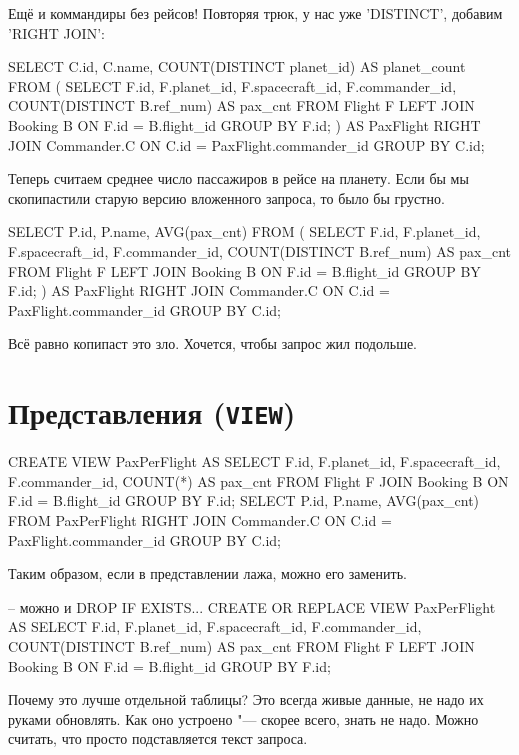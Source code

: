 Ещё и коммандиры без рейсов! Повторяя трюк, у нас уже \sql'DISTINCT', добавим \sql'RIGHT JOIN':
\begin{sqlcode}
SELECT
	C.id, C.name, COUNT(DISTINCT planet_id) AS planet_count
	FROM (
		SELECT
			F.id, F.planet_id, F.spacecraft_id, F.commander_id, COUNT(DISTINCT B.ref_num) AS pax_cnt
			FROM Flight F LEFT JOIN Booking B ON F.id = B.flight_id
			GROUP BY F.id;
	) AS PaxFlight
	RIGHT JOIN Commander.C ON C.id = PaxFlight.commander_id
	GROUP BY C.id;
\end{sqlcode}
Теперь считаем среднее число пассажиров в рейсе на планету.
Если бы мы скопипастили старую версию вложенного запроса, то было бы грустно.
\begin{sqlcode}
SELECT
	P.id, P.name, AVG(pax_cnt)
	FROM (
		SELECT
			F.id, F.planet_id, F.spacecraft_id, F.commander_id, COUNT(DISTINCT B.ref_num) AS pax_cnt
			FROM Flight F LEFT JOIN Booking B ON F.id = B.flight_id
			GROUP BY F.id;
	) AS PaxFlight
	RIGHT JOIN Commander.C ON C.id = PaxFlight.commander_id
	GROUP BY C.id;
\end{sqlcode}

Всё равно копипаст это зло.
Хочется, чтобы запрос жил подольше.

\section{Представления (\texorpdfstring{\tt VIEW}{VIEW})}

\begin{sqlcode}
CREATE VIEW PaxPerFlight AS
	SELECT
		F.id, F.planet_id, F.spacecraft_id, F.commander_id, COUNT(*) AS pax_cnt
		FROM Flight F JOIN Booking B ON F.id = B.flight_id
		GROUP BY F.id;
SELECT
	P.id, P.name, AVG(pax_cnt)
	FROM PaxPerFlight
	RIGHT JOIN Commander.C ON C.id = PaxFlight.commander_id
	GROUP BY C.id;
\end{sqlcode}

Таким образом, если в представлении лажа, можно его заменить.
\begin{sqlcode}
-- можно и DROP IF EXISTS...
CREATE OR REPLACE VIEW PaxPerFlight AS
	SELECT
		F.id, F.planet_id, F.spacecraft_id, F.commander_id, COUNT(DISTINCT B.ref_num) AS pax_cnt
		FROM Flight F LEFT JOIN Booking B ON F.id = B.flight_id
		GROUP BY F.id;
\end{sqlcode}

Почему это лучше отдельной таблицы?
Это всегда живые данные, не надо их руками обновлять.
Как оно устроено "--- скорее всего, знать не надо.
Можно считать, что просто подставляется текст запроса.

